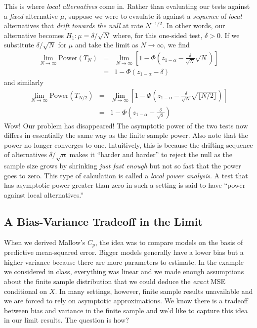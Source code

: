 \documentclass[12pt]{article}
\theoremstyle{definition}
\begin{document}
This is where \emph{local alternatives} come in. Rather than evaluating our tests against a \emph{fixed} alternative $\mu$, suppose we were to evaulate it against a \emph{sequence} of \emph{local} alternatives that \emph{drift towards the null} at rate $N^{-1/2}$. In other words, our alternative becomes $H_1 \colon \mu = \delta / \sqrt{N}$ where, for this one-sided test, $\delta > 0$. If we substitute $\delta/\sqrt{N}$ for $\mu$ and take the limit as $N\rightarrow \infty$, we find
\begin{eqnarray*}
	\lim_{N\rightarrow \infty} \mbox{Power}(T_{N}) &=& \lim_{N\rightarrow \infty}\left[1 - \Phi\left(z_{1-\alpha} - \frac{\delta}{\sqrt{N}}\sqrt{N}\right) \right]\\
	 &=& 1 - \Phi\left(z_{1-\alpha} - \delta \right)
\end{eqnarray*}
and similarly
\begin{eqnarray*}
	\lim_{N\rightarrow \infty} \mbox{Power}(T_{N/2}) &=& \lim_{N\rightarrow \infty}\left[1 - \Phi\left(z_{1-\alpha} - \frac{\delta}{\sqrt{N}}\sqrt{\lfloor N/2 \rfloor }\right) \right]\\
	 &=& 1 - \Phi\left(z_{1-\alpha} - \frac{\delta}{\sqrt{2}} \right)
\end{eqnarray*}
Wow! Our problem has disappeared! The asymptotic power of the two tests now differs in essentially the same way as the finite sample power. Also note that the power no longer converges to one. Intuitively, this is because the drifting sequence of alternatives $\delta/\sqrt{n}$ makes it ``harder and harder'' to reject the null as the sample size grows by shrinking \emph{just fast enough} but not so fast that the power goes to zero. This type of calculation is called a \emph{local power analysis}. A test that has asymptotic power greater than zero in such a setting is said to have ``power against local alternatives.''

\subsection{A Bias-Variance Tradeoff in the Limit}
When we derived Mallow's $C_p$, the idea was to compare models on the basis of predictive mean-squared error. Bigger models generally have a lower bias but a higher variance because there are more parameters to estimate. In the example we considered in class, everything was linear and we made enough assumptions about the finite sample distribution that we could deduce the \emph{exact} MSE conditional on $X$. In many settings, however, finite sample results unavailable and we are forced to rely on asymptotic approximations. We know there is a tradeoff between bias and variance in the finite sample and we'd like to capture this idea in our limit results. The question is how?
\end{document}

